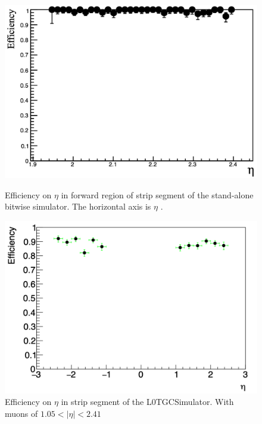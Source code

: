 \begin{figure}[htbp]
  \begin{minipage}{0.485\textwidth}
    \centering
    \vspace{-2mm}
    \includegraphics[width=\linewidth]{figs/chapter5/yamashita_strip_eff_new.png}
    \caption{Efficiency on $\eta$ in forward region of strip segment of the stand-alone bitwise simulator. The horizontal axis is $\eta$ \cite{yamashita}.}
    \label{fig:yama_strip}
  \end{minipage}
  \hfill
  \begin{minipage}{0.505\textwidth}
    \centering
    \includegraphics[width=\linewidth]{figs/chapter5/eff_strip_eta_big.png}
    \caption{Efficiency on $\eta$ in strip segment of the L0TGCSimulator. With muons of $1.05 < |\eta| < 2.41$}
    \label{fig:eff_strip_eta}
  \end{minipage}
\end{figure}

